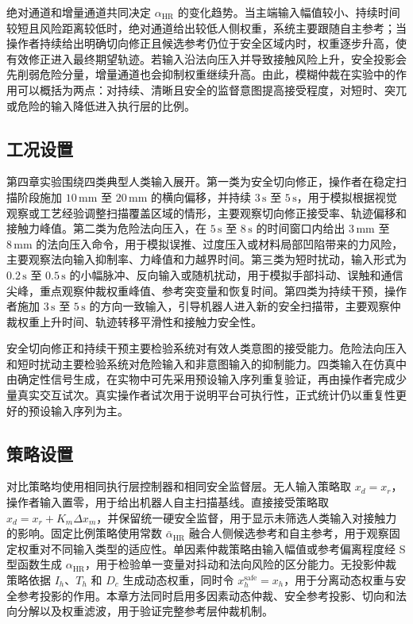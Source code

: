 绝对通道和增量通道共同决定 $\alpha_{\mathrm{HR}}$ 的变化趋势。当主端输入幅值较小、持续时间较短且风险距离较低时，绝对通道给出较低人侧权重，系统主要跟随自主参考；当操作者持续给出明确切向修正且候选参考仍位于安全区域内时，权重逐步升高，使有效修正进入最终期望轨迹。若输入沿法向压入并导致接触风险上升，安全投影会先削弱危险分量，增量通道也会抑制权重继续升高。由此，模糊仲裁在实验中的作用可以概括为两点：对持续、清晰且安全的监督意图提高接受程度，对短时、突兀或危险的输入降低进入执行层的比例。

\subsection{工况设置}
\label{subsec:ch4_input_setting}

第四章实验围绕四类典型人类输入展开。第一类为安全切向修正，操作者在稳定扫描阶段施加 $10\,\mathrm{mm}$ 至 $20\,\mathrm{mm}$ 的横向偏移，并持续 $3\,\mathrm{s}$ 至 $5\,\mathrm{s}$，用于模拟根据视觉观察或工艺经验调整扫描覆盖区域的情形，主要观察切向修正接受率、轨迹偏移和接触力峰值。第二类为危险法向压入，在 $5\,\mathrm{s}$ 至 $8\,\mathrm{s}$ 的时间窗口内给出 $3\,\mathrm{mm}$ 至 $8\,\mathrm{mm}$ 的法向压入命令，用于模拟误推、过度压入或材料局部凹陷带来的力风险，主要观察法向输入抑制率、力峰值和力越界时间。第三类为短时扰动，输入形式为 $0.2\,\mathrm{s}$ 至 $0.5\,\mathrm{s}$ 的小幅脉冲、反向输入或随机扰动，用于模拟手部抖动、误触和通信尖峰，重点观察仲裁权重峰值、参考突变量和恢复时间。第四类为持续干预，操作者施加 $3\,\mathrm{s}$ 至 $5\,\mathrm{s}$ 的方向一致输入，引导机器人进入新的安全扫描带，主要观察仲裁权重上升时间、轨迹转移平滑性和接触力安全性。

安全切向修正和持续干预主要检验系统对有效人类意图的接受能力。危险法向压入和短时扰动主要检验系统对危险输入和非意图输入的抑制能力。四类输入在仿真中由确定性信号生成，在实物中可先采用预设输入序列重复验证，再由操作者完成少量真实交互试次。真实操作者试次用于说明平台可执行性，正式统计仍以重复性更好的预设输入序列为主。

\subsection{策略设置}
\label{subsec:ch4_method_setting}

对比策略均使用相同执行层控制器和相同安全监督层。无人输入策略取 $x_d=x_r$，操作者输入置零，用于给出机器人自主扫描基线。直接接受策略取 $x_d=x_r+K_m\Delta x_m$，并保留统一硬安全监督，用于显示未筛选人类输入对接触力的影响。固定比例策略使用常数 $\bar\alpha_{\mathrm{HR}}$ 融合人侧候选参考和自主参考，用于观察固定权重对不同输入类型的适应性。单因素仲裁策略由输入幅值或参考偏离程度经 S 型函数生成 $\alpha_{\mathrm{HR}}$，用于检验单一变量对抖动和法向风险的区分能力。无投影仲裁策略依据 $I_h$、$T_h$ 和 $D_c$ 生成动态权重，同时令 $x_h^{\mathrm{safe}}=x_h$，用于分离动态权重与安全参考投影的作用。本章方法同时启用多因素动态仲裁、安全参考投影、切向和法向分解以及权重滤波，用于验证完整参考层仲裁机制。

